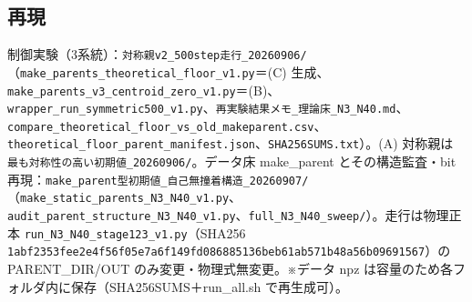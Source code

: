 \documentclass[
  a4paper,
]{ltjsarticle}
\begin{document}
\subsection{再現}\label{ux518dux73fe}

制御実験（3系統）：\texttt{対称親v2\_500step走行\_20260906/}（\texttt{make\_parents\_theoretical\_floor\_v1.py}＝(C)
生成、\texttt{make\_parents\_v3\_centroid\_zero\_v1.py}＝(B)、\texttt{wrapper\_run\_symmetric500\_v1.py}、\texttt{再実験結果メモ\_理論床\_N3\_N40.md}、\texttt{compare\_theoretical\_floor\_vs\_old\_makeparent.csv}、\texttt{theoretical\_floor\_parent\_manifest.json}、\texttt{SHA256SUMS.txt}）。(A)
対称親は \texttt{最も対称性の高い初期値\_20260906/}。データ床
make\_parent
とその構造監査・bit再現：\texttt{make\_parent型初期値\_自己無撞着構造\_20260907/}（\texttt{make\_static\_parents\_N3\_N40\_v1.py}、\texttt{audit\_parent\_structure\_N3\_N40\_v1.py}、\texttt{full\_N3\_N40\_sweep/}）。走行は物理正本
\texttt{run\_N3\_N40\_stage123\_v1.py}（SHA256
\texttt{1abf2353fee2e4f56f05e7a6f149fd086885136beb61ab571b48a56b09691567}）の
PARENT\_DIR/OUT のみ変更・物理式無変更。※データ npz
は容量のため各フォルダ内に保存（SHA256SUMS＋run\_all.sh で再生成可）。
\end{document}
